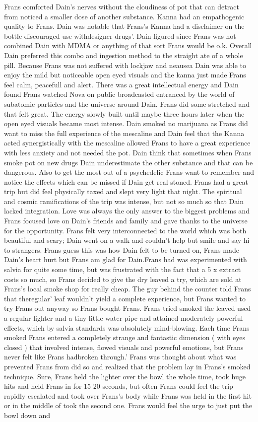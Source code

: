 \documentclass[12pt]{book}
\begin{document}
Frans comforted Dain's nerves without the cloudiness of pot that can detract from noticed a smaller dose of another substance. Kanna had an empathogenic quality to Frans. Dain was notable that Frans's Kanna had a disclaimer on the bottle discouraged use withdesigner drugs'. Dain figured since Frans was not combined Dain with MDMA or anything of that sort Frans would be o.k. Overall Dain preferred this combo and ingestion method to the straight ate of a whole pill. Because Frans was not suffered with lockjaw and neausea Dain was able to enjoy the mild but noticeable open eyed visuals and the kanna just made Frans feel calm, peacefull and alert. There was a great intellectual energy and Dain found Frans watched Nova on public broadcasted entranced by the world of subatomic particles and the universe around Dain. Frans did some stretched and that felt great. The energy slowly built until maybe three hours later when the open eyed visuals became most intense. Dain smoked no marijuana as Frans did want to miss the full experience of the mescaline and Dain feel that the Kanna acted synergistically with the mescaline allowed Frans to have a great experience with less anxiety and not needed the pot. Dain think that sometimes when Frans smoke pot on new drugs Dain underestimate the other substance and that can be dangerous. Also to get the most out of a psychedelic Frans want to remember and notice the effects which can be missed if Dain get real stoned. Frans had a great trip but did feel physically taxed and slept very light that night. The spiritual and cosmic ramifications of the trip was intense, but not so much so that Dain lacked integration. Love was always the only answer to the biggest problems and Frans focused love on Dain's friends and family and gave thanks to the universe for the opportunity. Frans felt very interconnected to the world which was both beautiful and scary; Dain went on a walk and couldn't help but smile and say hi to strangers. Frans guess this was how Dain felt to be turned on, Frans made Dain's heart hurt but Frans am glad for Dain.Frans had was experimented with salvia for quite some time, but was frustrated with the fact that a 5 x extract costs so much, so Frans decided to give the dry leaved a try, which are sold at Frans's local smoke shop for really cheap. The guy behind the counter told Frans that theregular' leaf wouldn't yield a complete experience, but Frans wanted to try Frans out anyway so Frans bought Frans. Frans tried smoked the leaved used a regular lighter and a tiny little water pipe and attained moderately powerful effects, which by salvia standards was absolutely mind-blowing. Each time Frans smoked Frans entered a completely strange and fantastic dimension ( with eyes closed ) that involved intense, flowed visuals and powerful emotions, but Frans never felt like Frans hadbroken through.' Frans was thought about what was prevented Frans from did so and realized that the problem lay in Frans's smoked technique. Sure, Frans held the lighter over the bowl the whole time, took huge hits and held Frans in for 15-20 seconds, but often Frans could feel the trip rapidly escalated and took over Frans's body while Frans was held in the first hit or in the middle of took the second one. Frans would feel the urge to just put the bowl down and 
\end{document}

